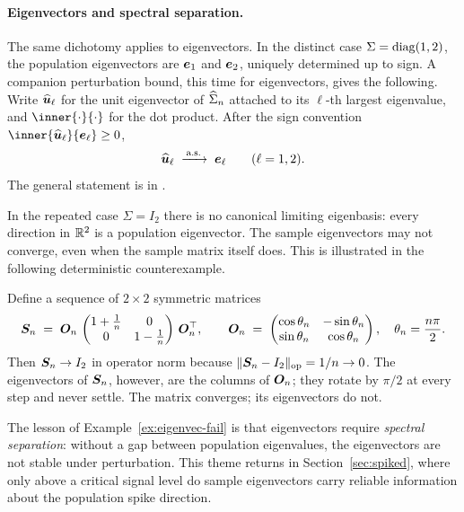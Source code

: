 \paragraph{Eigenvectors and spectral separation.} The same dichotomy applies to eigenvectors. In the distinct case \(\Sigma = \operatorname{diag}(1, 2)\), the population eigenvectors are \(\bm{e}_1\) and \(\bm{e}_2\), uniquely determined up to sign. A companion perturbation bound, this time for eigenvectors, gives the following. Write \(\widehat{\bm{u}}_\ell\) for the unit eigenvector of \(\widehat{\Sigma}_n\) attached to its \(\ell\)-th largest eigenvalue, and \(\inner{\cdot}{\cdot}\) for the dot product. After the sign convention \(\inner{\widehat{\vect{u}}_\ell}{\vect{e}_\ell} \ge 0\),
\[
  \widehat{\bm{u}}_\ell \;\xrightarrow{\,\text{a.s.}\,}\; \bm{e}_\ell \qquad (\ell = 1, 2).
\]
The general statement is in \citet[][Lem.~B.2]{DidierPipiras2012}.

In the repeated case \(\Sigma = I_2\) there is no canonical limiting eigenbasis: every direction in \(\mathbb{R}^2\) is a population eigenvector. The sample eigenvectors may not converge, even when the sample matrix itself does. This is illustrated in the following deterministic counterexample.

\begin{example}\label{ex:eigenvec-fail}
Define a sequence of \(2 \times 2\) symmetric matrices
\[
  \bm{S}_n \;=\; \bm{O}_n\, \begin{pmatrix} 1 + \tfrac{1}{n} & 0 \\ 0 & 1 - \tfrac{1}{n} \end{pmatrix}\, \bm{O}_n^{\top},
  \qquad
  \bm{O}_n \;=\; \begin{pmatrix} \cos\theta_n & -\sin\theta_n \\ \sin\theta_n & \cos\theta_n \end{pmatrix}, \quad \theta_n = \frac{n \pi}{2}.
\]
Then \(\bm{S}_n \to I_2\) in operator norm because \(\lVert\bm{S}_n - I_2\rVert_{\mathrm{op}} = 1/n \to 0\). The eigenvectors of \(\bm{S}_n\), however, are the columns of \(\bm{O}_n\); they rotate by \(\pi/2\) at every step and never settle. The matrix converges; its eigenvectors do not.
\end{example}

The lesson of Example~\ref{ex:eigenvec-fail} is that eigenvectors require \emph{spectral separation}: without a gap between population eigenvalues, the eigenvectors are not stable under perturbation. This theme returns in Section~\ref{sec:spiked}, where only above a critical signal level do sample eigenvectors carry reliable information about the population spike direction.

